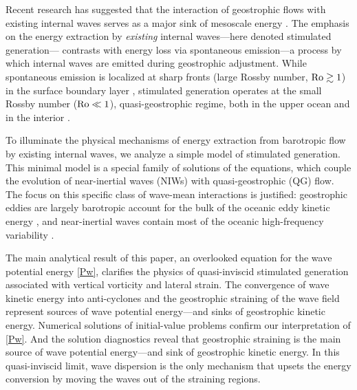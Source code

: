 \documentclass{jfm}
\begin{document}
Recent research has suggested that the interaction
of geostrophic flows with existing internal waves serves
as a major sink of mesoscale energy
\citep{xie_vanneste2015,taylor_straub2016,wagner_young2016,barkan_etal2016,shakespeare_hogg2017}.
The emphasis on the energy extraction by \textit{existing} internal waves---here
denoted stimulated generation---
contrasts with energy loss via spontaneous emission---a process
by which internal waves are emitted during geostrophic adjustment.
While spontaneous emission is localized
at sharp fronts (large Rossby number, $\mathrm{Ro}\gtrsim 1$) in the surface boundary
layer \citep[e.g., ][]{shakespeare_hogg2017}, stimulated generation operates at
the small Rossby number ($\mathrm{Ro}\ll 1$), quasi-geostrophic regime, both in the upper
ocean and in the interior \citep[e.g., ][]{xie_vanneste2015}.


To illuminate the physical mechanisms of energy extraction from
barotropic flow by existing internal waves, we analyze a
simple model of stimulated generation. This minimal model is a special
family of solutions of the \cite{xie_vanneste2015} equations, which couple the
evolution of near-inertial waves (NIWs) with quasi-geostrophic (QG) flow. The
focus on this specific class of wave-mean interactions is justified:  geostrophic
eddies are largely barotropic account for the bulk of the oceanic eddy kinetic energy
\cite[$90\%$,][]{ferrari_wunsch2009}, and near-inertial waves contain most of the
oceanic high-frequency variability \citep{alford_etal2016}.

The main analytical result of this paper, an overlooked equation for the wave potential
energy \eqref{Pw}, clarifies the physics of quasi-inviscid stimulated generation
associated with vertical vorticity and lateral strain. The convergence of wave
kinetic energy into anti-cyclones and the geostrophic straining of the wave field
represent sources of wave potential energy---and sinks of geostrophic kinetic energy.
Numerical solutions of
initial-value problems confirm our interpretation of \eqref{Pw}. And the solution
diagnostics reveal that geostrophic straining is the main source of wave potential
energy---and sink of geostrophic kinetic energy. In this quasi-inviscid limit,
wave dispersion is the only mechanism that upsets the energy conversion by moving
the waves out of the straining regions.
\end{document}
